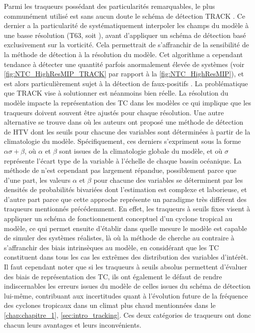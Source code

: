 \documentclass[../main.tex]{subfiles}
\begin{document}
Parmi les traqueurs possédant des particularités remarquables, le plus communément utilisé est sans aucun doute le schéma de détection TRACK
\parencite{hodges_how_2017}. Ce dernier a la particularité de systématiquement interpoler les champs du modèle à une basse résolution (T63, soit ),
avant d'appliquer un schéma de détection basé exclusivement sur la vorticité. Cela permettrait de s'affranchir de la sensibilité de la méthode de détection à la
résolution du modèle. Cet algorithme a cependant tendance à détecter une quantité parfois anormalement élevée de systèmes (voir \cref{fig:NTC_HighResMIP_TRACK}
par rapport à la \cref{fig:NTC_HighResMIP}), et est alors particulièrement sujet à la détection de faux-positifs \parencite{bourdin_intercomparison_2022}. La
problématique que TRACK vise à solutionner est néanmoins bien réelle. La résolution du modèle impacte la représentation des TC dans les modèles ce qui implique
que les traqueurs doivent souvent être ajustés pour chaque résolution. Une autre alternative se trouve dans \cite{camargo_improving_2002} où les auteurs ont
proposé une méthode de détection de HTV dont les seuils pour chacune des variables sont déterminées à partir de la climatologie du modèle. Spécifiquement, ces
derniers s'expriment sous la forme $\alpha \sigma + \beta$, où $\alpha$ et $\beta$ sont issues de la climatologie globale du modèle, et où $\sigma$ représente
l'écart type de la variable à l'échelle de chaque bassin océanique. La méthode de \cite{camargo_improving_2002} n'est cependant pas largement répandue,
possiblement parce que d'une part, les valeurs $\alpha$ et $\beta$ pour chacune des variables se déterminent par les densités de probabilités bivariées dont
l'estimation est complexe et laborieuse, et d'autre part parce que cette approche représente un paradigme très différent des traqueurs mentionnés précédemment.
En effet, les traqueurs à seuils fixes visent à appliquer un schéma de fonctionnement conceptuel d'un cyclone tropical au modèle, ce qui permet ensuite
d'établir dans quelle mesure le modèle est capable de simuler des systèmes réalistes, là où la méthode de \cite{camargo_improving_2002} cherche au contraire à
s'affranchir des biais intrinsèques au modèle, en considérant que les TC constituent dans tous les cas les extrêmes des distribution des variables d'intérêt. Il
faut cependant noter que si les traqueurs à seuils absolus permettent d'évaluer des biais de représentation des TC, ils ont également le défaut de rendre
indiscernables les erreurs issues du modèle de celles issues du schéma de détection lui-même, contribuant aux incertitudes quant à l'évolution future de la
fréquence des cyclones tropicaux dans un climat plus chaud mentionnées dans le \cref{chap:chapitre_1}, \cref{sec:intro_tracking}. Ces deux catégories de
traqueurs ont donc chacun leurs avantages et leurs inconvénients.
\end{document}
